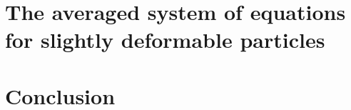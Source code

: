 \documentclass[11pt]{My_preprint}
\begin{document}
\section{The averaged system of equations for slightly deformable particles}
\label{sec:averaged_ellipsoid}





% 



% 
% 
% 
% 
% 


% 
% 
% 
% 

% 


% 
% 


% 
% 




\section{Conclusion}








\appendix

% 
% 
% 


% 

% 
% 
\end{document}
